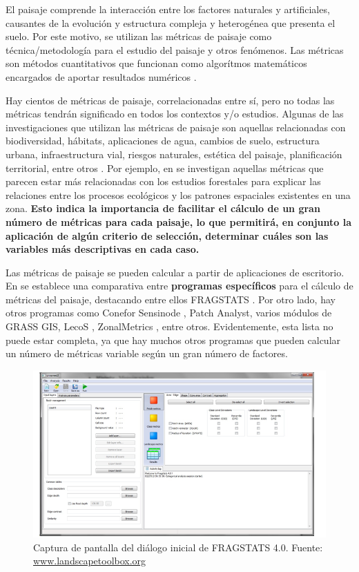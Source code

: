 El paisaje comprende la interacción entre los factores naturales y artificiales, causantes de la evolución y estructura compleja y heterogénea que presenta el suelo. Por este motivo, se utilizan las métricas de paisaje como técnica/metodología para el estudio del paisaje y otros fenómenos. Las métricas son métodos cuantitativos que funcionan como algorítmos matemáticos encargados de aportar resultados numéricos \citep{Gine2014}.

Hay cientos de métricas de paisaje, correlacionadas entre sí, pero no todas las métricas tendrán significado en todos los contextos y/o estudios. Algunas de las investigaciones que utilizan las métricas de paisaje son aquellas relacionadas con biodiversidad, hábitats, aplicaciones de agua, cambios de suelo, estructura urbana, infraestructura vial, riesgos naturales, estética del paisaje, planificación territorial, entre otros \citep{Uuemaa2009}. Por ejemplo, en \citet{Uuemaa2017} se investigan aquellas métricas que parecen estar más relacionadas con los estudios forestales para explicar las relaciones entre los procesos ecológicos y los patrones espaciales existentes en una zona. \textbf{Esto indica la importancia de facilitar el cálculo de un gran número de métricas para cada paisaje, lo que permitirá, en conjunto la aplicación de algún criterio de selección, determinar cuáles son las variables más descriptivas en cada caso.}

Las métricas de paisaje se pueden calcular a partir de aplicaciones de escritorio. En \citet{Zaragozi2012} se establece una comparativa entre \textbf{programas específicos} para el cálculo de métricas del paisaje, destacando entre ellos FRAGSTATS \citep{McGarigal1994,McGarigal2015}. Por otro lado, hay otros programas como Conefor Sensinode \citep{Saura2009}, Patch Analyst, varios módulos de GRASS GIS, LecoS \citep{Jung2016}, ZonalMetrics \citep{Adamczyk2017}, entre otros. Evidentemente, esta lista no puede estar completa, ya que hay muchos otros programas que pueden calcular un número de métricas variable según un gran número de factores.

\begin{figure}
\includegraphics[width=\textwidth]{Introduccion/Figs/fragstatsmodeldialog}
\caption{Captura de pantalla del diálogo inicial de FRAGSTATS 4.0\label{fig:fragstatsmodeldialog}. Fuente: \url{www.landscapetoolbox.org}}
\end{figure}


